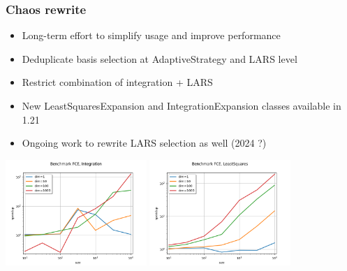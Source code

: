\documentclass[aspectratio=169]{beamer}
\begin{document}

\begin{frame}
\frametitle{Chaos rewrite}
\begin{itemize}
\item Long-term effort to simplify usage and improve performance
\item Deduplicate basis selection at AdaptiveStrategy and LARS level
\item Restrict combination of integration + LARS
\item New LeastSquaresExpansion and IntegrationExpansion classes available in 1.21
\item Ongoing work to rewrite LARS selection as well (2024 ?)
\end{itemize}

\vspace{6pt}

\begin{center}
\includegraphics[width=0.4\textwidth]{figures/Integration}
\includegraphics[width=0.4\textwidth]{figures/LeastSquares}
\end{center}

\end{frame}

\end{document}
